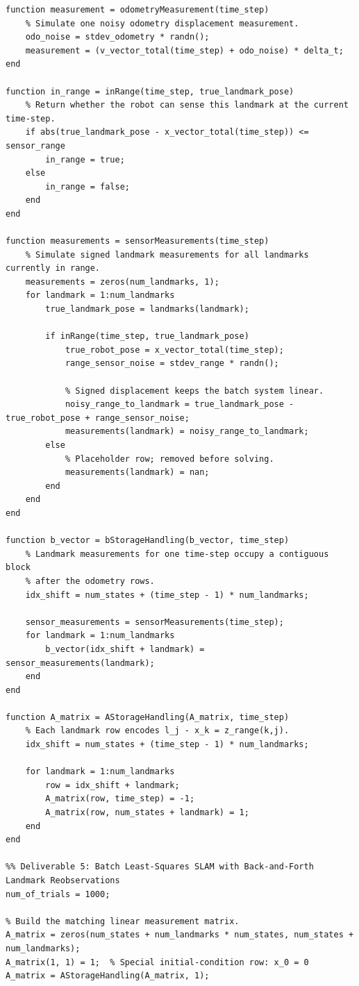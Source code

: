 \documentclass[11pt]{article}
\begin{document}
\begin{lstlisting}[caption={sim5.m}, label={lst:sim5}]
function measurement = odometryMeasurement(time_step)
    % Simulate one noisy odometry displacement measurement.
    odo_noise = stdev_odometry * randn();
    measurement = (v_vector_total(time_step) + odo_noise) * delta_t;
end

function in_range = inRange(time_step, true_landmark_pose)
    % Return whether the robot can sense this landmark at the current time-step.
    if abs(true_landmark_pose - x_vector_total(time_step)) <= sensor_range
        in_range = true;
    else
        in_range = false;
    end
end

function measurements = sensorMeasurements(time_step)
    % Simulate signed landmark measurements for all landmarks currently in range.
    measurements = zeros(num_landmarks, 1);
    for landmark = 1:num_landmarks
        true_landmark_pose = landmarks(landmark);

        if inRange(time_step, true_landmark_pose)
            true_robot_pose = x_vector_total(time_step);
            range_sensor_noise = stdev_range * randn();

            % Signed displacement keeps the batch system linear.
            noisy_range_to_landmark = true_landmark_pose - true_robot_pose + range_sensor_noise;
            measurements(landmark) = noisy_range_to_landmark;
        else
            % Placeholder row; removed before solving.
            measurements(landmark) = nan;
        end
    end
end

function b_vector = bStorageHandling(b_vector, time_step)
    % Landmark measurements for one time-step occupy a contiguous block
    % after the odometry rows.
    idx_shift = num_states + (time_step - 1) * num_landmarks;

    sensor_measurements = sensorMeasurements(time_step);
    for landmark = 1:num_landmarks
        b_vector(idx_shift + landmark) = sensor_measurements(landmark);
    end
end

function A_matrix = AStorageHandling(A_matrix, time_step)
    % Each landmark row encodes l_j - x_k = z_range(k,j).
    idx_shift = num_states + (time_step - 1) * num_landmarks;

    for landmark = 1:num_landmarks
        row = idx_shift + landmark;
        A_matrix(row, time_step) = -1;
        A_matrix(row, num_states + landmark) = 1;
    end
end

%% Deliverable 5: Batch Least-Squares SLAM with Back-and-Forth Landmark Reobservations
num_of_trials = 1000;

% Build the matching linear measurement matrix.
A_matrix = zeros(num_states + num_landmarks * num_states, num_states + num_landmarks);
A_matrix(1, 1) = 1;  % Special initial-condition row: x_0 = 0
A_matrix = AStorageHandling(A_matrix, 1);


\end{lstlisting}
\end{document}
